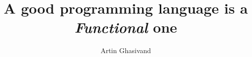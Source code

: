 \documentclass[pdf]{beamer}
\title{A good programming language is a \textit{Functional} one}
\author{Artin Ghasivand}
\begin{document}
\begin{frame}
  \titlepage
\end{frame}
\end{document}

